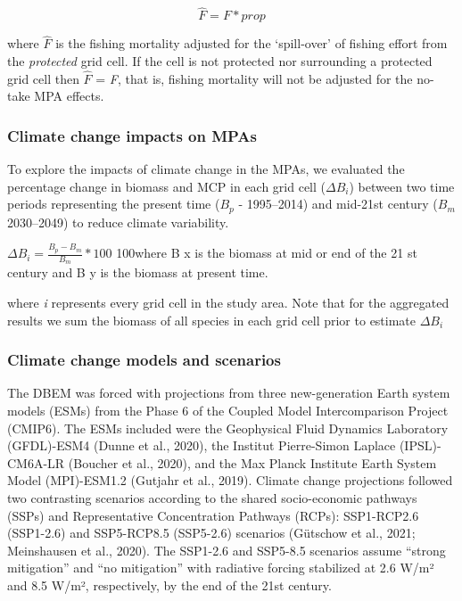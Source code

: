 \documentclass[
]{article}
\begin{document}
\[\hat{F}= F*prop\]

where \(\hat{F}\) is the fishing mortality adjusted for the `spill-over' of fishing effort from the \emph{protected} grid cell. If the cell is not protected nor surrounding a protected grid cell then \(\hat{F}\) = \emph{F}, that is, fishing mortality will not be adjusted for the no-take MPA effects.

\hypertarget{climate-change-impacts-on-mpas-1}{%
\subsubsection{Climate change impacts on MPAs}\label{climate-change-impacts-on-mpas-1}}

To explore the impacts of climate change in the MPAs, we evaluated the percentage change in biomass and MCP in each grid cell (\(ΔB_i\)) between two time periods representing the present time (\(B_p\) - 1995--2014) and mid-21st century (\(B_m\) 2030--2049) to reduce climate variability.

\(ΔB_i = \frac{B_p − B_m}{B_m}*100\) 100where B x is the biomass at mid or end of the 21 st century and B y is the biomass at present time.

where \emph{i} represents every grid cell in the study area. Note that for the aggregated results we sum the biomass of all species in each grid cell prior to estimate \(ΔB_i\)

\hypertarget{climate-change-models-and-scenarios-1}{%
\subsubsection{Climate change models and scenarios}\label{climate-change-models-and-scenarios-1}}

The DBEM was forced with projections from three new-generation Earth system models (ESMs) from the Phase 6 of the Coupled Model Intercomparison Project (CMIP6). The ESMs included were the Geophysical Fluid Dynamics Laboratory (GFDL)-ESM4 (Dunne et al., 2020), the Institut Pierre-Simon Laplace (IPSL)-CM6A-LR (Boucher et al., 2020), and the Max Planck Institute Earth System Model (MPI)-ESM1.2 (Gutjahr et al., 2019). Climate change projections followed two contrasting scenarios according to the shared socio-economic pathways (SSPs) and Representative Concentration Pathways (RCPs): SSP1-RCP2.6 (SSP1-2.6) and SSP5-RCP8.5 (SSP5-2.6) scenarios (Gütschow et al., 2021; Meinshausen et al., 2020). The SSP1-2.6 and SSP5-8.5 scenarios assume ``strong mitigation'' and ``no mitigation'' with radiative forcing stabilized at 2.6 W/m² and 8.5 W/m², respectively, by the end of the 21st century.
\end{document}
